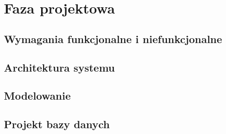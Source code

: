 \section{Faza projektowa}
\label{sec:projekt}

\subsection{Wymagania funkcjonalne i niefunkcjonalne}

\subsection{Architektura systemu}

\subsection{Modelowanie}

\subsection{Projekt bazy danych}

